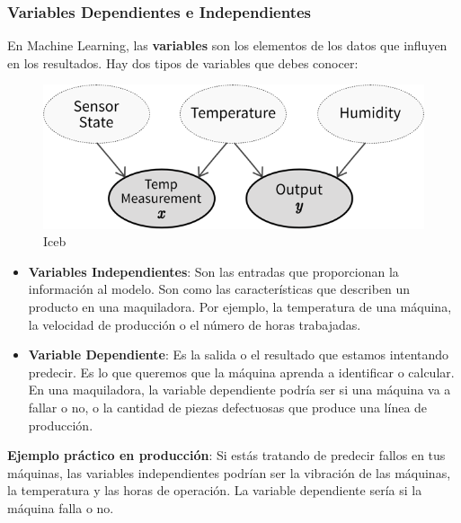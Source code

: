\documentclass[
  10pt,
  letterpaper,
]{book}
\begin{document}
\subsubsection{\texorpdfstring{\textbf{Variables Dependientes e
Independientes}}{Variables Dependientes e Independientes}}\label{variables-dependientes-e-independientes}

En Machine Learning, las \textbf{variables} son los elementos de los
datos que influyen en los resultados. Hay dos tipos de variables que
debes conocer:

\begin{figure}[H]

{\centering \includegraphics{Img/imagen_157.jpg}

}

\caption{Iceb}

\end{figure}%

\begin{itemize}
\item
  \textbf{Variables Independientes}: Son las entradas que proporcionan
  la información al modelo. Son como las características que describen
  un producto en una maquiladora. Por ejemplo, la temperatura de una
  máquina, la velocidad de producción o el número de horas trabajadas.
\item
  \textbf{Variable Dependiente}: Es la salida o el resultado que estamos
  intentando predecir. Es lo que queremos que la máquina aprenda a
  identificar o calcular. En una maquiladora, la variable dependiente
  podría ser si una máquina va a fallar o no, o la cantidad de piezas
  defectuosas que produce una línea de producción.
\end{itemize}

\textbf{Ejemplo práctico en producción}: Si estás tratando de predecir
fallos en tus máquinas, las variables independientes podrían ser la
vibración de las máquinas, la temperatura y las horas de operación. La
variable dependiente sería si la máquina falla o no.
\end{document}
